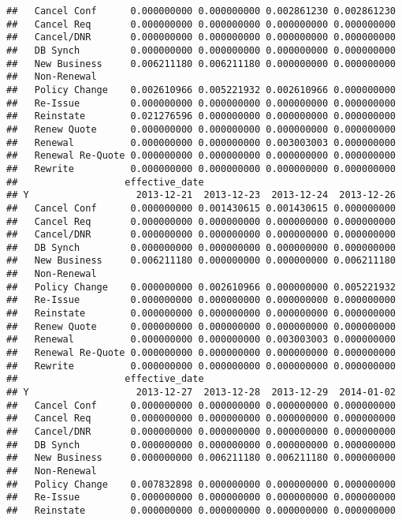 \documentclass[]{article}
\begin{document}
\begin{verbatim}
##   Cancel Conf      0.000000000 0.000000000 0.002861230 0.002861230
##   Cancel Req       0.000000000 0.000000000 0.000000000 0.000000000
##   Cancel/DNR       0.000000000 0.000000000 0.000000000 0.000000000
##   DB Synch         0.000000000 0.000000000 0.000000000 0.000000000
##   New Business     0.006211180 0.006211180 0.000000000 0.000000000
##   Non-Renewal                                                     
##   Policy Change    0.002610966 0.005221932 0.002610966 0.000000000
##   Re-Issue         0.000000000 0.000000000 0.000000000 0.000000000
##   Reinstate        0.021276596 0.000000000 0.000000000 0.000000000
##   Renew Quote      0.000000000 0.000000000 0.000000000 0.000000000
##   Renewal          0.000000000 0.000000000 0.003003003 0.000000000
##   Renewal Re-Quote 0.000000000 0.000000000 0.000000000 0.000000000
##   Rewrite          0.000000000 0.000000000 0.000000000 0.000000000
##                   effective_date
## Y                   2013-12-21  2013-12-23  2013-12-24  2013-12-26
##   Cancel Conf      0.000000000 0.001430615 0.001430615 0.000000000
##   Cancel Req       0.000000000 0.000000000 0.000000000 0.000000000
##   Cancel/DNR       0.000000000 0.000000000 0.000000000 0.000000000
##   DB Synch         0.000000000 0.000000000 0.000000000 0.000000000
##   New Business     0.006211180 0.000000000 0.000000000 0.006211180
##   Non-Renewal                                                     
##   Policy Change    0.000000000 0.002610966 0.000000000 0.005221932
##   Re-Issue         0.000000000 0.000000000 0.000000000 0.000000000
##   Reinstate        0.000000000 0.000000000 0.000000000 0.000000000
##   Renew Quote      0.000000000 0.000000000 0.000000000 0.000000000
##   Renewal          0.000000000 0.000000000 0.003003003 0.000000000
##   Renewal Re-Quote 0.000000000 0.000000000 0.000000000 0.000000000
##   Rewrite          0.000000000 0.000000000 0.000000000 0.000000000
##                   effective_date
## Y                   2013-12-27  2013-12-28  2013-12-29  2014-01-02
##   Cancel Conf      0.000000000 0.000000000 0.000000000 0.000000000
##   Cancel Req       0.000000000 0.000000000 0.000000000 0.000000000
##   Cancel/DNR       0.000000000 0.000000000 0.000000000 0.000000000
##   DB Synch         0.000000000 0.000000000 0.000000000 0.000000000
##   New Business     0.000000000 0.006211180 0.006211180 0.000000000
##   Non-Renewal                                                     
##   Policy Change    0.007832898 0.000000000 0.000000000 0.000000000
##   Re-Issue         0.000000000 0.000000000 0.000000000 0.000000000
##   Reinstate        0.000000000 0.000000000 0.000000000 0.000000000

\end{verbatim}
\end{document}
